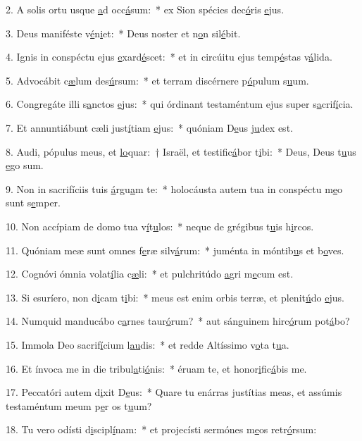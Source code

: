 2. A solis ortu usque \uline{a}d occ\uline{á}sum:~* ex Sion spécies dec\uline{ó}ris \uline{e}jus.\par 
3. Deus maniféste v\uline{é}n\uline{i}et:~* Deus noster et n\uline{o}n sil\uline{é}bit.\par 
4. Ignis in conspéctu ejus \uline{e}xard\uline{é}scet:~* et in circúitu ejus temp\uline{é}stas v\uline{á}lida.\par 
5. Advocábit c\uline{æ}lum des\uline{ú}rsum:~* et terram discérnere p\uline{ó}pulum s\uline{u}um.\par 
6. Congregáte illi s\uline{a}nctos \uline{e}jus:~* qui órdinant testaméntum ejus super s\uline{a}crif\uline{í}cia.\par 
7. Et annuntiábunt cæli just\uline{í}tiam \uline{e}jus:~* quóniam D\uline{e}us j\uline{u}dex est.\par 
8. Audi, pópulus meus, et \uline{lo}quar:~† Israël, et testific\uline{á}bor t\uline{i}bi:~* Deus, Deus t\uline{u}us \uline{e}go sum.\par 
9. Non in sacrifíciis tuis \uline{á}rgu\uline{a}m te:~* holocáusta autem tua in conspéctu m\uline{e}o sunt s\uline{e}mper.\par 
10. Non accípiam de domo tua v\uline{í}t\uline{u}los:~* neque de grégibus t\uline{u}is h\uline{i}rcos.\par 
11. Quóniam meæ sunt omnes f\uline{e}ræ silv\uline{á}rum:~* juménta in móntib\uline{u}s et b\uline{o}ves.\par 
12. Cognóvi ómnia volat\uline{í}lia c\uline{æ}li:~* et pulchritúdo \uline{a}gri m\uline{e}cum est.\par 
13. Si esuríero, non d\uline{i}cam t\uline{i}bi:~* meus est enim orbis terræ, et plenit\uline{ú}do \uline{e}jus.\par 
14. Numquid manducábo c\uline{a}rnes taur\uline{ó}rum?~* aut sánguinem hirc\uline{ó}rum pot\uline{á}bo?\par 
15. Immola Deo sacrif\uline{í}cium l\uline{au}dis:~* et redde Altíssimo v\uline{o}ta t\uline{u}a.\par 
16. Et ínvoca me in die tribul\uline{a}ti\uline{ó}nis:~* éruam te, et honor\uline{i}fic\uline{á}bis me.\par 
17. Peccatóri autem d\uline{i}xit D\uline{e}us:~* Quare tu enárras justítias meas, et assúmis testaméntum meum p\uline{e}r os t\uline{u}um?\par 
18. Tu vero odísti d\uline{i}scipl\uline{í}nam:~* et projecísti sermónes m\uline{e}os retr\uline{ó}rsum:\par 
